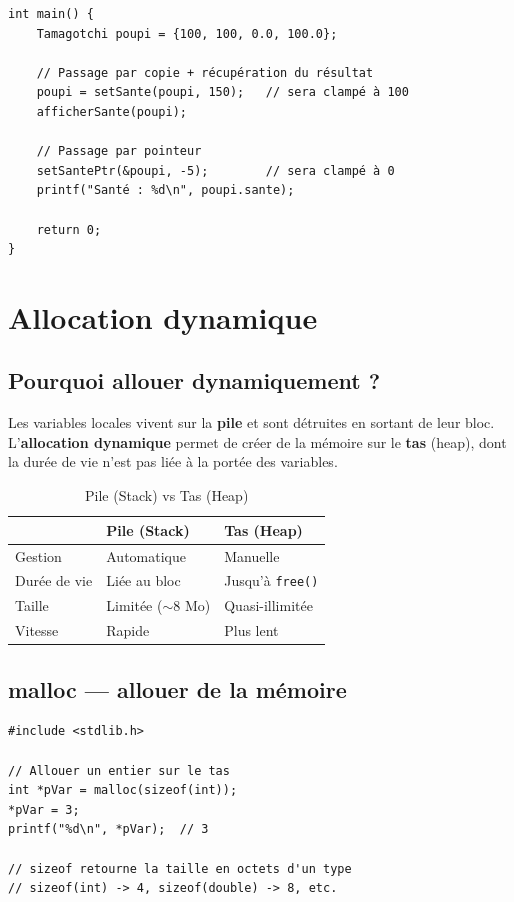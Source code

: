 \documentclass[12pt,a4paper]{article}
\begin{document}
\begin{lstlisting}[caption={Utilisation dans main.c}]
int main() {
    Tamagotchi poupi = {100, 100, 0.0, 100.0};

    // Passage par copie + récupération du résultat
    poupi = setSante(poupi, 150);   // sera clampé à 100
    afficherSante(poupi);

    // Passage par pointeur
    setSantePtr(&poupi, -5);        // sera clampé à 0
    printf("Santé : %d\n", poupi.sante);

    return 0;
}
\end{lstlisting}

\section{Allocation dynamique}

\subsection{Pourquoi allouer dynamiquement ?}

Les variables locales vivent sur la \textbf{pile} et sont détruites en sortant de leur bloc. L'\textbf{allocation dynamique} permet de créer de la mémoire sur le \textbf{tas} (heap), dont la durée de vie n'est pas liée à la portée des variables.

\begin{table}[h!]
\centering
\caption{Pile (Stack) vs Tas (Heap)}
\begin{tabular}{lll}
\toprule
 & \textbf{Pile (Stack)} & \textbf{Tas (Heap)} \\
\midrule
Gestion & Automatique & Manuelle \\
Durée de vie & Liée au bloc & Jusqu'à \texttt{free()} \\
Taille & Limitée ($\sim$8 Mo) & Quasi-illimitée \\
Vitesse & Rapide & Plus lent \\
\bottomrule
\end{tabular}
\end{table}

\subsection{malloc — allouer de la mémoire}

\begin{lstlisting}[caption={Allocation avec malloc}]
#include <stdlib.h>

// Allouer un entier sur le tas
int *pVar = malloc(sizeof(int));
*pVar = 3;
printf("%d\n", *pVar);  // 3

// sizeof retourne la taille en octets d'un type
// sizeof(int) -> 4, sizeof(double) -> 8, etc.
\end{lstlisting}
\end{document}

